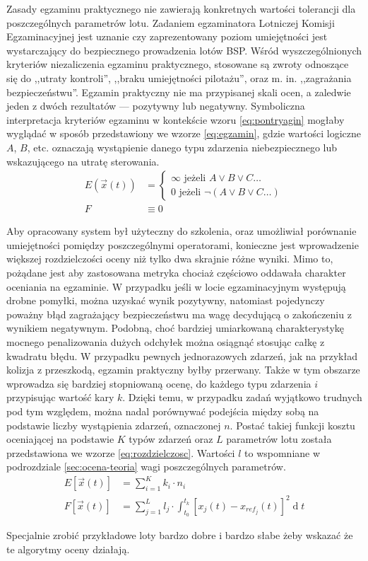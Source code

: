 Zasady egzaminu praktycznego nie zawierają konkretnych wartości tolerancji dla poszczególnych parametrów lotu. Zadaniem egzaminatora Lotniczej Komisji Egzaminacyjnej jest uznanie czy zaprezentowany poziom umiejętności jest wystarczający do bezpiecznego prowadzenia lotów BSP. Wśród wyszczególnionych kryteriów niezaliczenia egzaminu praktycznego, stosowane są zwroty odnoszące się do ,,utraty kontroli'', ,,braku umiejętności pilotażu'', oraz m. in. ,,zagrażania bezpieczeństwu''. Egzamin praktyczny nie ma przypisanej skali ocen, a zaledwie jeden z dwóch rezultatów --- pozytywny lub negatywny. Symboliczna interpretacja kryteriów egzaminu w kontekście wzoru \ref{eq:pontryagin} mogłaby wyglądać w sposób przedstawiony we wzorze \ref{eq:egzamin}, gdzie wartości logiczne $ A $, $ B $, etc. oznaczają wystąpienie danego typu zdarzenia niebezpiecznego lub wskazującego na utratę sterowania.
\begin{align}
    \label{eq:egzamin}
    E\left( \vec{x}(t) \right) &=
    \left\{
        \begin{array}{ll}
            \infty \mbox{ jeżeli } A \lor B \lor C \dots \\
            0 \mbox{ jeżeli } \neg ( A \lor B \lor C \dots)
        \end{array}
    \right.
    \\
    F & \equiv 0
\end{align}

Aby opracowany system był użyteczny do szkolenia, oraz umożliwiał porównanie umiejętności pomiędzy poszczególnymi operatorami, konieczne jest wprowadzenie większej rozdzielczości oceny niż tylko dwa skrajnie różne wyniki. Mimo to, pożądane jest aby zastosowana metryka chociaż częściowo oddawała charakter oceniania na egzaminie. W przypadku jeśli w locie egzaminacyjnym występują drobne pomyłki, można uzyskać wynik pozytywny, natomiast pojedynczy poważny błąd zagrażający bezpieczeństwu ma wagę decydującą o zakończeniu z wynikiem negatywnym. Podobną, choć bardziej umiarkowaną charakterystykę mocnego penalizowania dużych odchyłek można osiągnąć stosując całkę z kwadratu błędu. W przypadku pewnych jednorazowych zdarzeń, jak na przykład kolizja z przeszkodą, egzamin praktyczny byłby przerwany. Także w tym obszarze wprowadza się bardziej stopniowaną ocenę, do każdego typu zdarzenia $ i $ przypisując wartość kary $ k $. Dzięki temu, w przypadku zadań wyjątkowo trudnych pod tym względem, można nadal porównywać podejścia między sobą na podstawie liczby wystąpienia zdarzeń, oznaczonej $ n $. Postać takiej funkcji kosztu oceniającej na podstawie $ K $ typów zdarzeń oraz $ L $ parametrów lotu została przedstawiona we wzorze \ref{eq:rozdzielczosc}. Wartości $ l $ to wspomniane w podrozdziale \ref{sec:ocena-teoria} wagi poszczególnych parametrów.
\begin{align}
    \label{eq:rozdzielczosc}
    E[ \vec{x}(t) ] &= \sum_{i=1}^{K} k_i \cdot n_i
    \\
    F[ \vec{x}(t) ] &= \sum_{j=1}^{L} l_j \cdot \int_{t_0}^{t_k} [ x_j(t) - x_{ref_j}(t) ]^2 \operatorname{d}t
\end{align}

\begin{todo}
    Specjalnie zrobić przykładowe loty bardzo dobre i bardzo słabe żeby wskazać że te algorytmy oceny działają.
\end{todo}